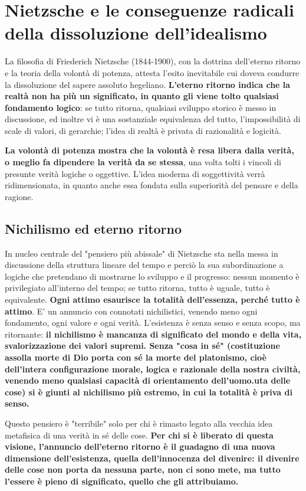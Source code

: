 \chapter{Nietzsche e le conseguenze radicali della dissoluzione dell'idealismo}
\bigskip
\bigskip
\bigskip
\bigskip
\bigskip
\bigskip


La filosofia di Friederich Nietzsche (1844-1900), con la dottrina dell'eterno ritorno e la teoria della volontà di potenza, attesta l'esito inevitabile cui doveva condurre la dissoluzione del sapere assoluto hegeliano. \textbf{L'eterno ritorno indica che la realtà non ha più un significato, in quanto gli viene tolto qualsiasi fondamento logico}: se tutto ritorna, qualsiasi sviluppo storico è messo in discussione, ed inoltre vi è una sostanziale equivalenza del tutto, l'impossibilità di scale di valori, di gerarchie; l'idea di realtà è privata di razionalità e logicità.

\textbf{La volontà di potenza mostra che la volontà è resa libera dalla verità, o meglio fa dipendere la verità da se stessa}, una volta tolti i vincoli di presunte verità logiche o oggettive. L'idea moderna di soggettività verrà ridimensionata, in quanto anche essa fondata sulla superiorità del pensare e della ragione.

\section{Nichilismo ed eterno ritorno}

In nucleo centrale del "pensiero più abissale" di Nietzsche sta nella messa in discussione della struttura lineare del tempo e perciò la sua subordinazione a logiche che pretendano di mostrarne lo sviluppo e il progresso: nessun momento è privilegiato all'interno del tempo; se tutto ritorna, tutto è uguale, tutto è equivalente. \textbf{Ogni attimo esaurisce la totalità dell'essenza, perché tutto è attimo}.
E' un annuncio con connotati nichilistici, venendo meno ogni fondamento, ogni valore e ogni verità. L'esistenza è senza senso e senza scopo, ma ritornante: \textbf{il nichilismo è  mancanza di significato del mondo e della vita, svalorizzazione dei valori supremi. Senza "cosa in sé" (costituzione assolla morte di Dio porta con sé la morte del platonismo, cioè dell'intera configurazione morale, logica e razionale della nostra civiltà, venendo meno qualsiasi capacità di orientamento dell'uomo.uta delle cose) si è giunti al nichilismo più estremo, in cui la totalità è priva di senso.}

Questo pensiero è "terribile" solo per chi è rimasto legato alla vecchia idea metafisica di una verità in sé delle cose. \textbf{Per chi si è liberato di questa visione, l'annuncio dell'eterno ritorno è il guadagno di una nuova dimensione dell'esistenza, quella dell'innocenza del divenire: il divenire delle cose non porta da nessuna parte, non ci sono mete, ma tutto l'essere è pieno di significato, quello che gli attribuiamo.}

